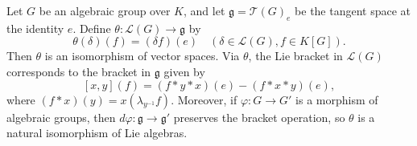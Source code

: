 Let $G$ be an algebraic group over $K$, and let $\mathfrak{g} = \mathcal{T}(G)_e$ be the tangent space at the identity $e$. Define $\theta: \mathcal{L}(G) \to \mathfrak{g}$ by
$$\theta(\delta)(f) = (\delta f)(e) \quad (\delta \in \mathcal{L}(G), f \in K[G]).$$
Then $\theta$ is an isomorphism of vector spaces. Via $\theta$, the Lie bracket in $\mathcal{L}(G)$ corresponds to the bracket in $\mathfrak{g}$ given by
$$[x, y](f) = (f * y * x)(e) - (f * x * y)(e),$$
where $(f * x)(y) = x(\lambda_{y^{-1}} f)$. Moreover, if $\varphi: G \to G'$ is a morphism of algebraic groups, then $d\varphi: \mathfrak{g} \to \mathfrak{g}'$ preserves the bracket operation, so $\theta$ is a natural isomorphism of Lie algebras.
